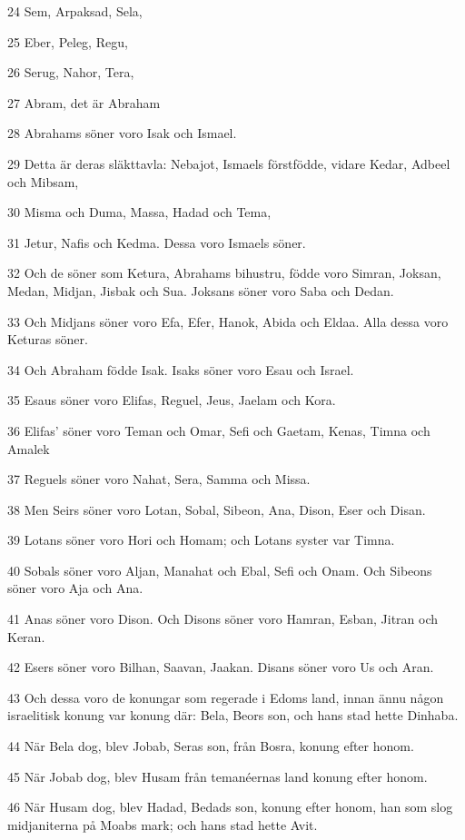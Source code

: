 \par 24 Sem, Arpaksad, Sela,
\par 25 Eber, Peleg, Regu,
\par 26 Serug, Nahor, Tera,
\par 27 Abram, det är Abraham
\par 28 Abrahams söner voro Isak och Ismael.
\par 29 Detta är deras släkttavla: Nebajot, Ismaels förstfödde, vidare Kedar, Adbeel och Mibsam,
\par 30 Misma och Duma, Massa, Hadad och Tema,
\par 31 Jetur, Nafis och Kedma. Dessa voro Ismaels söner.
\par 32 Och de söner som Ketura, Abrahams bihustru, födde voro Simran, Joksan, Medan, Midjan, Jisbak och Sua. Joksans söner voro Saba och Dedan.
\par 33 Och Midjans söner voro Efa, Efer, Hanok, Abida och Eldaa. Alla dessa voro Keturas söner.
\par 34 Och Abraham födde Isak. Isaks söner voro Esau och Israel.
\par 35 Esaus söner voro Elifas, Reguel, Jeus, Jaelam och Kora.
\par 36 Elifas' söner voro Teman och Omar, Sefi och Gaetam, Kenas, Timna och Amalek
\par 37 Reguels söner voro Nahat, Sera, Samma och Missa.
\par 38 Men Seirs söner voro Lotan, Sobal, Sibeon, Ana, Dison, Eser och Disan.
\par 39 Lotans söner voro Hori och Homam; och Lotans syster var Timna.
\par 40 Sobals söner voro Aljan, Manahat och Ebal, Sefi och Onam. Och Sibeons söner voro Aja och Ana.
\par 41 Anas söner voro Dison. Och Disons söner voro Hamran, Esban, Jitran och Keran.
\par 42 Esers söner voro Bilhan, Saavan, Jaakan. Disans söner voro Us och Aran.
\par 43 Och dessa voro de konungar som regerade i Edoms land, innan ännu någon israelitisk konung var konung där: Bela, Beors son, och hans stad hette Dinhaba.
\par 44 När Bela dog, blev Jobab, Seras son, från Bosra, konung efter honom.
\par 45 När Jobab dog, blev Husam från temanéernas land konung efter honom.
\par 46 När Husam dog, blev Hadad, Bedads son, konung efter honom, han som slog midjaniterna på Moabs mark; och hans stad hette Avit.
